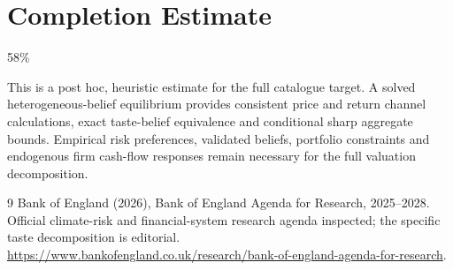 \documentclass[11pt]{article}
\begin{document}
\section{Completion Estimate}
58\%

This is a post hoc, heuristic estimate for the full catalogue target.
A solved heterogeneous-belief equilibrium provides consistent price and return channel calculations, exact taste-belief equivalence and conditional sharp aggregate bounds. Empirical risk preferences, validated beliefs, portfolio constraints and endogenous firm cash-flow responses remain necessary for the full valuation decomposition.

\begin{thebibliography}{9}
 Bank of England (2026), Bank of England Agenda for Research, 2025--2028. Official climate-risk and financial-system research agenda inspected; the specific taste decomposition is editorial. \url{https://www.bankofengland.co.uk/research/bank-of-england-agenda-for-research}.
\end{thebibliography}
\end{document}
